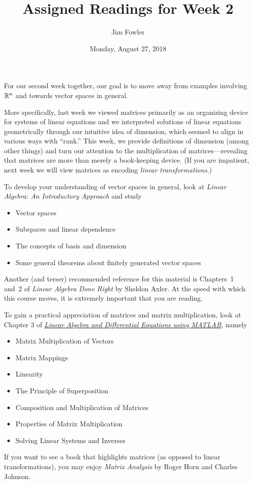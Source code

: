 \documentclass{homework}
\author{Jim Fowler}
\title{Assigned Readings for Week 2}
\date{Monday, August 27, 2018}
\begin{document}
\maketitle

For our second week together, our goal is to move away from examples
involving $\mathbb{R}^n$ and towards vector spaces in general.

More specifically, last week we viewed matrices primarily as an
organizing device for systems of linear equations and we interpreted
solutions of linear equations geometrically through our intuitive idea
of dimension, which seemed to align in various ways with ``rank.''
This week, we provide definitions of dimension (among other things)
and turn our attention to the multiplication of matrices---revealing
that matrices are more than merely a book-keeping device.  (If you are
impatient, next week we will view matrices as encoding \textit{linear
  transformations}.)

To develop your understanding of vector spaces in general, look at
\textit{Linear Algebra: An Introductory Approach} and study
\begin{itemize}
\item {} Vector spaces
\item {} Subspaces and linear dependence
\item {} The concepts of basis and dimension
\item {} Some general theorems about finitely generated vector spaces
\end{itemize}
Another (and terser) recommended reference for this material is
Chapters~1 and~2 of \textit{Linear Algebra Done Right} by Sheldon
Axler.  At the speed with which this course moves, it is extremely
important that you are reading.

To gain a practical appreciation of matrices and matrix
multiplication, look at Chapter 3 of
\textit{\href{/courses/43735/files/folder/textbooks}{Linear Algebra
    and Differential Equations using MATLAB}}, namely
\begin{itemize}
\item {} Matrix Multiplication of Vectors
\item {} Matrix Mappings
\item {} Linearity
\item {} The Principle of Superposition
\item {} Composition and Multiplication of Matrices
\item {} Properties of Matrix Multiplication
\item {} Solving Linear Systems and Inverses
\end{itemize}
If you want to see a book that highlights matrices (as opposed to
linear transformations), you may enjoy \textit{Matrix Analysis} by
Roger Horn and Charles Johnson.
\end{document}
